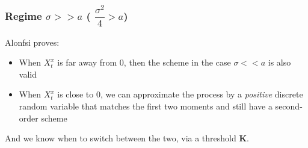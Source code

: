 \documentclass[12pt]{beamer}
\begin{document}
\begin{frame}
\frametitle{Regime $\sigma >> a$ ( $\dfrac{\sigma^{2}}{4} > a $) }

Alonfsi proves:

\begin{itemize}
	\item When $X^{x}_{t}$ is far away from 0, then the scheme in the case $\sigma << a$ is also valid
	\item When $X^{x}_{t}$ is close to 0, we can approximate the process by a \textit{positive} discrete random variable that matches the first two moments and still have a second-order scheme
\end{itemize}

And we know when to switch between the two, via a threshold $\mathbf{K}$.
\end{frame}
\end{document}
